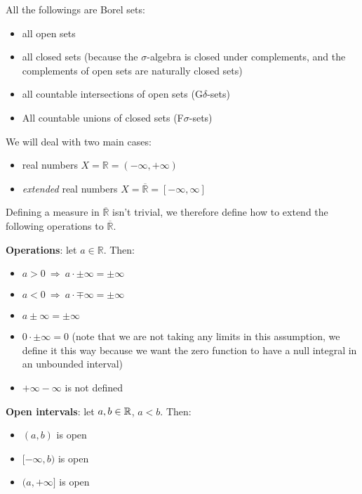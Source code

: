 All the followings are Borel sets:
\begin{itemize}
    \item all open sets
    \item all closed sets (because the $\sigma$-algebra is closed under complements, and the complements of open sets are naturally closed sets)
    \item all countable intersections of open sets (G$\delta$-sets)  
    \item All countable unions of closed sets (F$\sigma$-sets)  
\end{itemize}

We will deal with two main cases:
\begin{itemize}
    \item real numbers $X=\mathbb{R}=(-\infty,+\infty)$
    \item \textit{extended} real numbers $X=\overline{\mathbb{R}} = [-\infty,\infty]$ 
\end{itemize}

\begin{subtle}
Defining a measure in $\overline{\mathbb{R}}$ isn't trivial, we therefore define how to extend the following operations to $\overline{\mathbb{R}}$.

\textbf{Operations}: let $a\in \mathbb{R}$. Then:
\begin{itemize}
    \item $a>0\ \Longrightarrow\ a\cdot \pm \infty = \pm \infty$
    \item $a<0\ \Longrightarrow\ a\cdot \mp \infty = \pm \infty$
    \item $a\pm \infty = \pm \infty$
    \item $0\cdot \pm \infty = 0$ (note that we are not taking any limits in this assumption, we define it this way because we want the zero function to have a null integral in an unbounded interval)
    \item $+\infty -\infty$ is not defined
\end{itemize}

\textbf{Open intervals}: let $a,b\in\mathbb{R}$, $a<b$. Then:
\begin{itemize}
    \item $(a,b)$ is open
    \item $[-\infty , b)$ is open
    \item $(a,+\infty ]$ is open
\end{itemize}
\end{subtle}

\newpage

